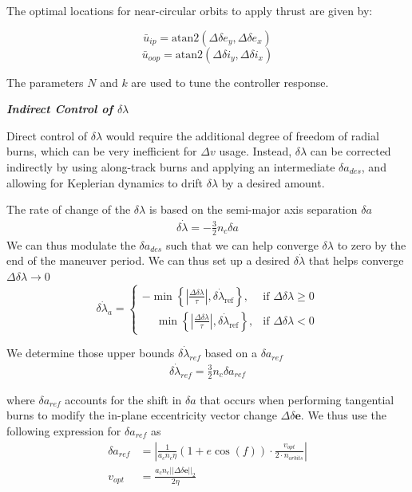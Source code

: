 The optimal locations for near-circular orbits to apply thrust are given by:

\[
\bar{u}_{ip} = \text{atan2} \left( \Delta \delta e_y, \Delta \delta e_x \right)
\]
\[
\bar{u}_{oop} = \text{atan2} \left( \Delta \delta i_y, \Delta \delta i_x \right)
\]

The parameters $N$ and $k$ are used to tune the controller response. 

\textbf{\textit{Indirect Control of $\delta\lambda$}}

Direct control of $\delta \lambda$ would require the additional degree of freedom of radial burns, which can be very inefficient for $\Delta v$ usage. Instead, $\delta \lambda$ can be corrected indirectly by using along-track burns and applying an intermediate $\delta a_{des}$, and allowing for Keplerian dynamics to drift $\delta \lambda$ by a desired amount. \cite{steindorf2017constrained}

The rate of change of the $\delta \lambda$ is based on the semi-major axis separation $\delta a$
\begin{align}
    \delta \dot{\lambda} = -\frac{3}{2}n_c \delta a 
\end{align}
We can thus modulate the $\delta a_{des}$ such that we can help converge $\delta \lambda$ to zero by the end of the maneuver period. We can thus set up a desired $\delta \dot{\lambda}$ that helps converge $\Delta \delta \lambda \rightarrow 0$
\begin{equation}
\delta \dot{\lambda}_a =
\begin{cases}
-\min \left\{ \left| \frac{\Delta \delta \lambda}{\tau} \right| , \delta \dot{\lambda}_{\text{ref}} \right\}, & \text{if } \Delta \delta \lambda \geq 0 \\
\phantom{-}\min \left\{ \left| \frac{\Delta \delta \lambda}{\tau} \right| , \delta \dot{\lambda}_{\text{ref}} \right\}, & \text{if } \Delta \delta \lambda < 0
\end{cases}
\end{equation}

We determine those upper bounds $\delta \dot{\lambda}_{ref}$ based on a $\delta a_{ref}$
\begin{align}
    \delta \dot{\lambda}_{ref} = \frac{3}{2} n_c \delta a_{ref}
\end{align}

where $\delta a_{ref}$ accounts for the shift in $\delta a$ that occurs when performing tangential burns to modify the in-plane eccentricity vector change $\Delta \delta \textbf{e}$. We thus use the following expression for $\delta a_{ref}$ as
\begin{align}
    \delta a_{ref} &= \left|\frac{1}{a_cn_c \eta}(1 + e \cos(f))\cdot  \frac{v_{opt}}{2\cdot n_{orbits}}\right| \\
    v_{opt} &= \frac{a_cn_c||\Delta\delta \textbf{e}||_2}{2\eta}
\end{align}


